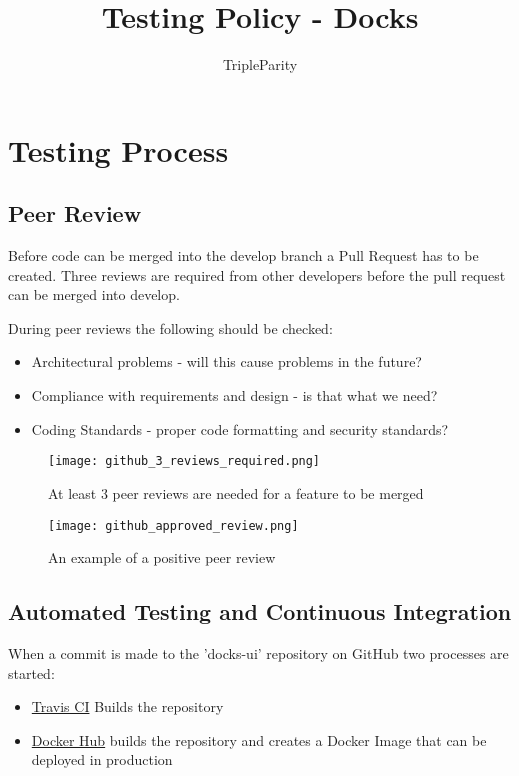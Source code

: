 \documentclass[]{article}
\title{Testing Policy - Docks}
\author{TripleParity}
\date{}
\begin{document}
\maketitle

\tableofcontents

\section{Testing Process}

\subsection{Peer Review}
Before code can be merged into the develop branch a Pull Request has to be created.
Three reviews are required from other developers before the pull request
can be merged into develop.

During peer reviews the following should be checked:
\begin{itemize}
	\item Architectural problems - will this cause problems in the future?
	\item Compliance with requirements and design - is that what we need?
	\item Coding Standards - proper code formatting and security standards?
\end{itemize}

\begin{figure}[H]
	\centering
	\texttt{[image: github\_3\_reviews\_required.png]}
	\caption{At least 3 peer reviews are needed for a feature to be merged}
\end{figure}

\begin{figure}[H]
	\centering
	\texttt{[image: github\_approved\_review.png]}
	\caption{An example of a positive peer review}
\end{figure}

\subsection{Automated Testing and Continuous Integration}
When a commit is made to the 'docks-ui' repository on GitHub two
processes are started:
\begin{itemize}
	\item \href{https://travis-ci.org/TripleParity/docks-ui/branches}{Travis CI} Builds the repository
	\item \href{https://hub.docker.com/r/tripleparity/docks-ui/builds/}{Docker Hub} builds the repository and creates a Docker Image that can be deployed in production
\end{itemize}
\end{document}
